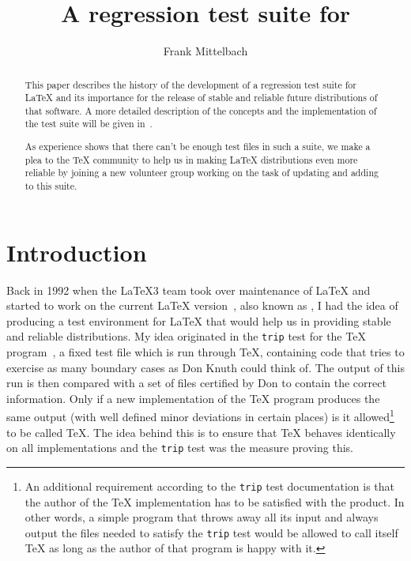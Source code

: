 \documentclass{ltugboat}
\begin{document}
\title{A regression test suite for \LaTeXe}

\author{Frank Mittelbach}
\address{\LaTeX3 project}


\maketitle

\begin{abstract}
  This paper describes the history of the development of a regression
  test suite for \LaTeX{} and its importance for the release of stable
  and reliable future distributions of that software. 
  A more detailed description of the concepts and the
  implementation of the test suite will be given in~\cite{tub:xxx}.

  As experience shows that there can't be enough test files in such a
  suite, we make a plea to the \TeX{} community to help us in making
  \LaTeX{} distributions even more reliable by joining a new volunteer
  group working on the task of updating and adding to this suite.
\end{abstract}


\section{Introduction}

Back in 1992 when the \LaTeX3 team took over maintenance of \LaTeX{}
and started to work on the current \LaTeX{} version~\cite{A-W:LLa94},
also known as \LaTeXe{}, I had the idea of producing a test
environment for \LaTeX{} that would help us in providing stable and
reliable distributions. My idea originated in the
\texttt{trip} test for the \TeX{} program~\cite{Knuth:1984:TTT}, a
fixed test file which is run through \TeX{}, containing code that tries
to exercise as many boundary cases as Don Knuth could think of.  The
output of this run is then compared with a set of files certified by
Don to contain the correct information. Only if a new implementation
of the \TeX{} program produces the same output (with well defined minor
deviations in certain places) is it allowed\footnote{An additional
requirement according to the \texttt{trip} test documentation is that
the author of the \TeX{} implementation has to be satisfied with the
product. In other words, a simple program that throws away all its
input and always output the files needed to satisfy the \texttt{trip}
test would be allowed to call itself \TeX{} as long as the author of
that program is happy with it.} to be called \TeX{}.  The idea behind
this is to ensure that \TeX{} behaves identically on all
implementations and the \texttt{trip} test was the measure proving
this.
\end{document}
